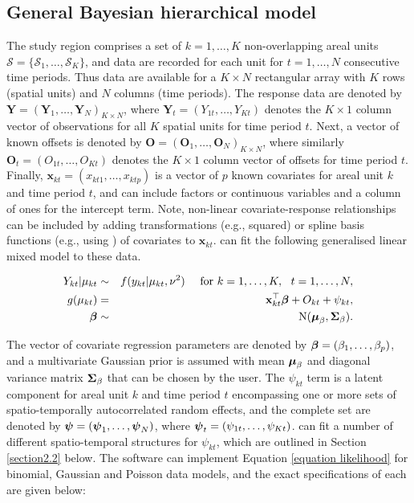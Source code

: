 \documentclass[article, nojss]{jss}
\newcommand{\bd}[1]{\ensuremath{\mbox{\boldmath $#1$}}}
\begin{document}
\subsection{General Bayesian hierarchical model}
The study region comprises a set of $k=1,\ldots,K$ non-overlapping areal units $\mathcal{S}=\{\mathcal{S}_{1},\ldots,\mathcal{S}_{K}\}$, and data are recorded for each unit for $t=1,\ldots,N$ consecutive time periods. Thus data are available for a $K\times N$ rectangular array with $K$ rows (spatial units) and $N$ columns (time periods). The response data are denoted by $\mathbf{Y}=(\mathbf{Y}_{1},\ldots,\mathbf{Y}_{N})_{K\times N}$, where $\mathbf{Y}_{t}=(Y_{1t},\ldots,Y_{Kt})$ denotes the $K\times 1$ column vector of observations for all $K$ spatial units for time period $t$. Next, a vector of known offsets is denoted by $\mathbf{O}=(\mathbf{O}_{1},\ldots,\mathbf{O}_{N})_{K\times N}$, where similarly $\mathbf{O}_{t}=(O_{1t},\ldots,O_{Kt})$ denotes the $K\times 1$ column  vector of offsets for time period $t$. Finally, $\mathbf{x}_{kt}=(x_{kt1},\ldots, x_{ktp})$ is a vector of $p$ known covariates for areal unit $k$ and time period $t$, and can include factors or continuous variables and a column of ones for the intercept term. Note, non-linear covariate-response relationships can be included by adding transformations (e.g., squared) or spline basis functions (e.g., using ) of covariates to $\mathbf{x}_{kt}$.  can fit the following generalised linear mixed model to these data.

\begin{eqnarray}
Y_{kt}|\mu_{kt}&\sim&f(y_{kt}|\mu_{kt},\nu^{2})~~~~\mbox{for }k=1,\ldots,K,~~t=1,\ldots,N,\label{equation likelihood}\\
g(\mu_{kt})&=&\mathbf{x}_{kt}^{\top}\bd{\beta} + O_{kt} + \psi_{kt},\nonumber\\
\bd{\beta}&\sim&\mbox{N}(\bd{\mu}_{\beta}, \bd{\Sigma}_{\beta}).\nonumber
\end{eqnarray}

The vector of covariate regression parameters are denoted by $\bd{\beta}=(\beta_{1},\ldots,\beta_{p})$, and a multivariate Gaussian prior is assumed with mean $\bd{\mu}_{\beta}$ and diagonal variance matrix $\bd{\Sigma}_{\beta}$  that can be chosen by the user. The $\psi_{kt}$ term is a latent component for areal unit $k$ and time period $t$ encompassing one or more sets of spatio-temporally autocorrelated random effects, and the complete set are denoted by $\bd{\psi}=(\bd{\psi}_{1},\ldots,\bd{\psi}_{N})$, where $\bd{\psi}_{t}=(\psi_{1t},\ldots,\psi_{Kt})$.  can fit a number of different spatio-temporal structures for $\psi_{kt}$, which are outlined in Section \ref{section2.2} below. The software can implement Equation \ref{equation likelihood} for binomial, Gaussian and Poisson data models, and the exact specifications of each are given below:
\end{document}
